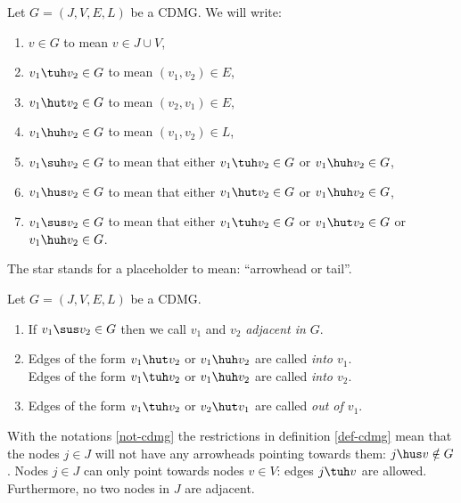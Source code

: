 \begin{Not}
    \label{not-cdmg}
    Let $G=(J,V,E,L)$ be a CDMG.
    We will write:
    \begin{enumerate}
        \item $v \in G$ to mean $v \in J \cup V$,
        \item $v_1 \tuh v_2 \in G$ to mean $(v_1,v_2) \in E$,
        \item $v_1 \hut v_2 \in G$ to mean $(v_2,v_1) \in E$,
        \item $v_1 \huh v_2 \in G$ to mean $(v_1,v_2) \in L$,
        \item $v_1 \suh v_2 \in G$ to mean that either $v_1 \tuh v_2 \in G$ or $v_1 \huh v_2 \in G$,
        \item $v_1 \hus v_2 \in G$ to mean that either $v_1 \hut v_2 \in G$ or $v_1 \huh v_2 \in G$,
        \item $v_1 \sus v_2 \in G$ to mean that either $v_1 \tuh v_2 \in G$ or $v_1 \hut v_2 \in G$ or $v_1 \huh v_2 \in G$.
    \end{enumerate}
    The star stands for a placeholder to mean: ``arrowhead or tail''.
\end{Not}

\begin{Def}
  Let $G=(J,V,E,L)$ be a CDMG.
  \begin{enumerate}
    \item If $v_1 \sus v_2 \in G$ then we call $v_1$ and $v_2$ \emph{adjacent in $G$}.
    \item Edges of the form $v_1 \hut v_2$ or $v_1 \huh v_2$ are called \emph{into $v_1$}.  \\
          Edges of the form $v_1 \tuh v_2$ or $v_1 \huh v_2$ are called \emph{into $v_2$}. 
    \item Edges of the form $v_1 \tuh v_2$ or $v_2 \hut v_1$ are called \emph{out of $v_1$}.
  \end{enumerate}
\end{Def}

\begin{Rem}
With the notations \ref{not-cdmg} the restrictions in definition \ref{def-cdmg} mean that the nodes $j \in J$ will not have any arrowheads pointing towards them: $ j \hus v \notin G$. Nodes $j \in J$ can only point towards nodes $v \in V$: edges $j \tuh v$ are allowed. Furthermore, no two nodes in $J$ are adjacent.
\end{Rem}

